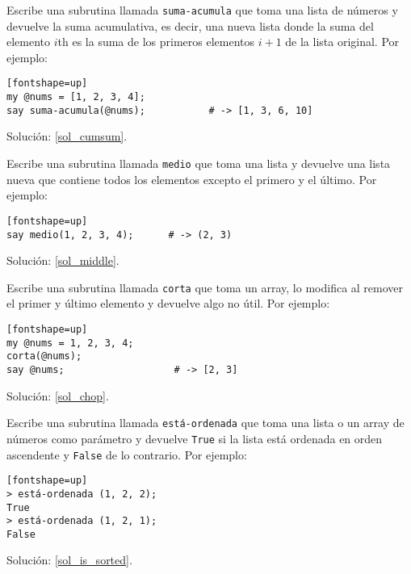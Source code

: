 \begin{exercise}
\label{cumulative}

Escribe una subrutina llamada \verb|suma-acumula| que toma una lista
de números y devuelve la suma acumulativa, es decir, una nueva lista
donde la suma del elemento $i$th es la suma de los primeros elementos
$i+1$ de la lista original. Por ejemplo:
\label{cumsum}

\begin{verbatim}[fontshape=up]
my @nums = [1, 2, 3, 4];
say suma-acumula(@nums);           # -> [1, 3, 6, 10]
\end{verbatim}

Solución: \ref{sol_cumsum}.

\end{exercise}

\begin{exercise}

Escribe una subrutina llamada \verb|medio| que toma una lista y devuelve
una lista nueva que contiene todos los elementos excepto el primero y el
último. Por ejemplo:
\label{middle}

\begin{verbatim}[fontshape=up]
say medio(1, 2, 3, 4);      # -> (2, 3)
\end{verbatim}

Solución: \ref{sol_middle}.

\end{exercise}

\begin{exercise}

Escribe una subrutina llamada \verb|corta| que toma un
array, lo modifica al remover el primer y último elemento y
devuelve algo no útil. Por ejemplo:
\label{chop}

\begin{verbatim}[fontshape=up]
my @nums = 1, 2, 3, 4;
corta(@nums);
say @nums;                   # -> [2, 3]
\end{verbatim}

Solución: \ref{sol_chop}.

\end{exercise}


\begin{exercise}
Escribe una subrutina llamada \verb|está-ordenada| que toma
una lista o un array de números como parámetro y devuelve {\tt True}
si la lista está ordenada en orden ascendente y {\tt False} 
de lo contrario. Por ejemplo:
\label{is_sorted}

\begin{verbatim}[fontshape=up]
> está-ordenada (1, 2, 2);
True
> está-ordenada (1, 2, 1);
False
\end{verbatim}

Solución: \ref{sol_is_sorted}.

\end{exercise}



